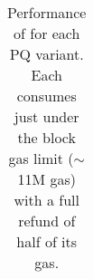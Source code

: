 \begin{table}[t]
\begin{tabular} {|>{\centering}m{5cm} |>{\centering}m{0.5cm} |>{\centering}m{1.5cm} |>{\centering}m{1.8cm} |>{\centering\arraybackslash}m{1.5cm}|}
\end{tabular}
\caption{Performance of \cm for each PQ variant. Each consumes just under the block gas limit ($\sim$11M gas) with a full refund of half of its gas.\label{tab:worst_case_matching}}





\end{table}


